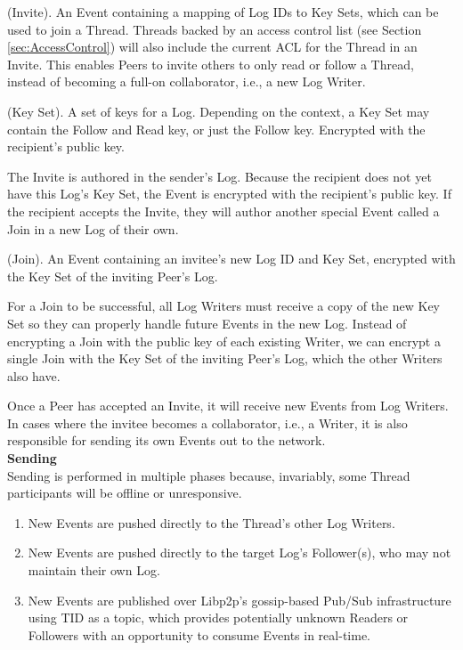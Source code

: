 \documentclass{comjnl}
\begin{document}
\begin{definition}
(Invite). An Event containing a mapping of Log IDs to Key Sets, which can be used to join a Thread. Threads backed by an access control list (see Section  \ref{sec:AccessControl}) will also include the current ACL for the Thread in an Invite. This enables Peers to invite others to only read or follow a Thread, instead of becoming a full-on collaborator, i.e., a new Log Writer.
\end{definition}

\begin{definition}
(Key Set). A set of keys for a Log. Depending on the context, a Key Set may contain the Follow and Read key, or just the Follow key. Encrypted with the recipient’s public key.
\end{definition}

The Invite is authored in the sender’s Log. Because the recipient does not yet have this Log’s Key Set, the Event is encrypted with the recipient’s public key. If the recipient accepts the Invite, they will author another special Event called a Join in a new Log of their own.

\begin{definition}
(Join). An Event containing an invitee’s new Log ID and Key Set, encrypted with the Key Set of the inviting Peer’s Log.
\end{definition}

For a Join to be successful, all Log Writers must receive a copy of the new Key Set so they can properly handle future Events in the new Log. Instead of encrypting a Join with the public key of each existing Writer, we can encrypt a single Join with the Key Set of the inviting Peer’s Log, which the other Writers also have.

Once a Peer has accepted an Invite, it will receive new Events from Log Writers. In cases where the invitee becomes a collaborator, i.e., a Writer, it is also responsible for sending its own Events out to the network.\\

\textbf{Sending} \\

Sending is performed in multiple phases because, invariably, some Thread participants will be offline or unresponsive. 

\begin{enumerate}
\item \label{Perf1}New Events are pushed directly to the Thread’s other Log Writers.
\item \label{Perf2}New Events are pushed directly to the target Log’s Follower(s), who may not maintain their own Log.
\item \label{Perf3} New Events are published over Libp2p’s gossip-based Pub/Sub infrastructure using TID as a topic, which provides potentially unknown Readers or Followers with an opportunity to consume Events in real-time.
\end{enumerate}
\end{document}
